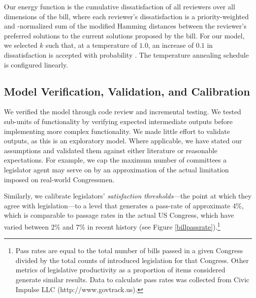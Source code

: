 \documentclass[pdftex,12pt]{llncs}
\begin{document}
Our energy function is the cumulative dissatisfaction of all reviewers over all dimensions of the bill, where each reviewer's dissatisfaction is a priority-weighted and -normalized sum of the modified Hamming distances between the reviewer's preferred solutions to the current solutions proposed by the bill.  For our model, we selected $k$ such that, at a temperature of $1.0$, an increase of $0.1$ in dissatisfaction is accepted with probability .  The temperature annealing schedule is configured linearly.

\subsection{Model Verification, Validation, and Calibration}
We verified the model through code review and incremental testing.
We tested sub-units of functionality by verifying expected intermediate outputs before implementing more complex functionality.
We made little effort to validate outputs, as this is an exploratory model.  
Where applicable, we have stated our assumptions and validated them against either literature or reasonable expectations.  
For example, we cap the maximum number of committees a legislator agent may serve on by an approximation of the actual limitation imposed on real-world Congressmen.

Similarly, we calibrate legislators' \textit{satisfaction thresholds}---the point at which they agree with legislation---to a level that generates a pass-rate of approximate 4\%, which is comparable to passage rates in the actual US Congress, which have varied between 2\% and 7\% in recent history (see Figure \ref{billpassrate}).\footnote{Pass rates are equal to the total number of bills passed in a given Congress divided by the total counts of introduced legislation for that Congress. Other metrics of legislative productivity as a proportion of items considered generate similar results. Data to calculate pass rates was collected from Civic Impulse LLC (http://www.govtrack.us).\label{passfn}}


\printbibliography
\end{document}
